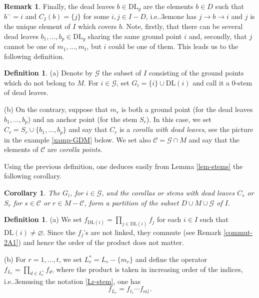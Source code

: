 \documentclass[12pt]{amsart}
\numberwithin{equation}{section}
\newtheorem{cor}[thm]{Corollary}
\theoremstyle{definition}
\newtheorem{defin}[thm]{Definition}
\newtheorem{rem}[thm]{Remark}
\def\ie{{i.e.}\kern.3em}
\def\calG{\mathcal{G}} %
\def\DL{\mathrm{DL}}  %
\begin{document}
\begin{rem} Finally, the dead leaves $b\in \DL_g$ are the elements $b\in D$ such that $b^- = i$ and 
$C_I(b) = \{j\}$ for some $i,j \in I - D$, \ie one has $j \to b \to i$ and $j$ is the unique element of $I$ which covers $b$. 
Note, firstly,  that there can be several dead leaves $b_1,\dots, b_p\in \DL_g$ sharing the same ground point $i$ and, 
secondly, that $j$ cannot be one of $m_1,\dots, m_t$, but $i$ could be one of them. This leads us to the following definition. 
\end{rem} 

\begin{defin} (a) Denote by $\calG$ the subset of $I$ consisting of the ground points which do not belong to $M$. For $i\in \calG$, set $G_i = \{i\} \cup  \DL(i)$ and call it a $0$-stem of dead leaves. 

\smallskip 
(b) On the contrary, suppose that $m_r$ is both a ground point (for the dead leaves $b_1,\dots, b_p$) and an 
anchor point (for the stem $S_r$). In this case, we set $C_r = S_r \cup \{b_1,\dots, b_p\}$ 
and say that $C_r$ is a \emph{corolla with dead leaves}, see the picture in the example \ref{xamp-GDM} below. 
We set also $\mathcal{C} = \calG \cap M$ and say that the elements of $\mathcal{C}$ are \emph{corolla points}. 
\end{defin} 

Using the previous definition, one deduces easily from Lemma \ref{lem-stems} the following corollary. 

\begin{cor} The $G_i$, for $i\in \calG$, and the corollas or stems with dead leaves $C_s$ or $S_r$ for $s\in \mathcal{C}$ 
or $r\in M -\mathcal{C}$, form a partition of the subset $D \cup M \cup \calG$ of $I$. 
\end{cor} 

\begin{defin} (a) We set $f_{\DL(i)} = \prod_{j \in \DL(i)} f_j$ for each 
$i\in I$ such that $\DL(i)\not= \varnothing$. Since the $f_j$'s are not linked, 
they commute (see Remark \ref{commut-2A1}) and hence the order of the product does not matter. 


\smallskip 
(b) For $r=1,\dots, t$, we set $L_r^* = L_r - \{m_r\}$ and define the operator 
$f_{L_r} = \prod_{d\in L_r^*} f_d$, 
where the product is taken in increasing order of the indices, \ie using the notation \eqref{Lr-stem}, one has 
\begin{equation}\label{def-f-Lr} 
f_{L_r} = f_{\ell_r} \cdots f_{m_r^1} . 
\end{equation} 
\end{defin} 
\end{document}
